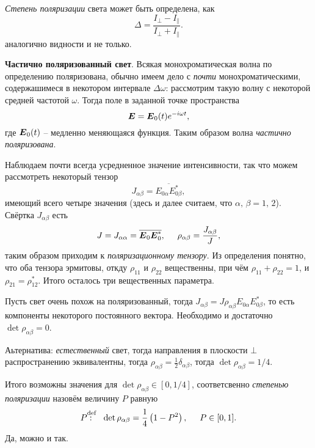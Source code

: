 \textit{Степень поляризации} света может быть определена, как
\begin{equation*}
    \Delta = \frac{I_{\bot}-I_{\parallel}}{I_\bot + I_\parallel}.
\end{equation*}
аналогично видности и не только. 


\textbf{Частично поляризованный свет}. Всякая монохроматическая волна по определению поляризована, обычно имеем дело с \textit{почти} монохроматическими, содержашимеся в некотором интервале $\Delta \omega$: рассмотрим такую волну с некоторой средней частотой $\omega$. Тогда поле в заданной точке пространства
\begin{equation*}
    \mbox{\boldmath $E$} = \mbox{\boldmath $E$}_0 (t) e^{-i \omega t},
\end{equation*}
где $\mbox{\boldmath $E$}_0 (t)$ -- медленно меняющаяся функция. Таким образом волна \textit{частично поляризована}. 

Наблюдаем почти всегда усредненное значение интенсивности, так что можем рассмотреть некоторый тензор
\begin{equation*}
    J_{\alpha \beta} = \overline{E_{0 \alpha} E_{0 \beta}^*},
\end{equation*}
имеющий всего четыре значения (здесь и далее считаем, что $\alpha,\, \beta = 1,\, 2$). Свёртка $J_{\alpha \beta}$  есть
\begin{equation*}
    J = J_{\alpha \alpha} = \overline{\mbox{\boldmath $E$}_0 \mbox{\boldmath $E$}_0^*},
    \hspace{5 mm} 
    \rho_{\alpha \beta} = \frac{J_{\alpha\beta}}{J},
\end{equation*}
таким образом приходим к \textit{поляризационному тензору}. Из определения понятно, что оба тензора эрмитовы, откду $\rho_{11}$ и $\rho_{22}$ вещественны, при чём $\rho_{11} + \rho_{22} = 1$, и $\rho_{21} = \rho_{12}^*$. Итого осталось три вещественных параметра. 

Пусть свет очень похож на поляризованный, тогда $J_{\alpha \beta} = J \rho_{\alpha \beta} E_{0 \alpha} E_{0 \beta}^*$, то есть компоненты некоторого постоянного вектора. Необходимо и достаточно $\det \rho_{\alpha \beta} = 0$. 

Аьтернатива: \textit{естественный} свет, тогда направления в плоскости $\bot$ распространению эквивалентны, тогда $\rho_{\alpha \beta} = \frac{1}{2} \delta_{\alpha \beta}$, тогда $\det \rho_{\alpha \beta} = 1/4$.

Итого возможны значения для $\det \rho_{\alpha \beta} \in [0, 1/4]$, соответсвенно \textit{степенью поляризации} назовём величину $P$ равную
\begin{equation*}
    P \overset{\mathrm{def}}{\colon} \ \ \det \rho_{\alpha \beta} = \frac{1}{4} \left(1-P^2\right), \hspace{5 mm} 
    P \in [0, 1]. 
\end{equation*}
Да, можно и так. 


